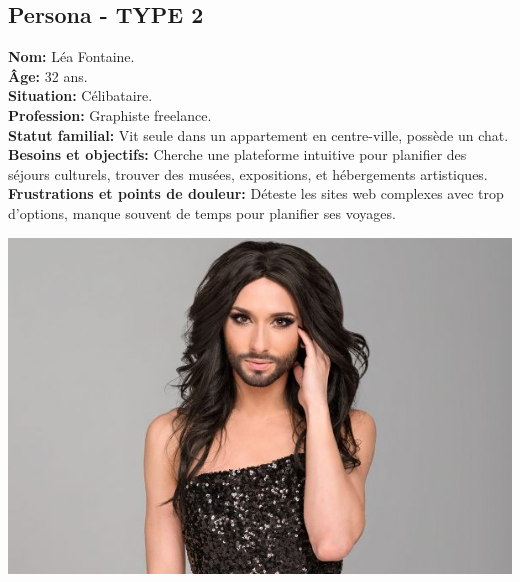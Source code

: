 \documentclass[a4paper,11pt]{article}
\begin{document}
\subsection{Persona - TYPE 2}
\begin{minipage}{0.6\textwidth} %
    \textbf{Nom:} Léa Fontaine.\\
    \textbf{Âge:} 32 ans.\\
    \textbf{Situation:} Célibataire.\\
    \textbf{Profession:} Graphiste freelance.\\
    \textbf{Statut familial:} Vit seule dans un appartement en centre-ville, possède un chat.\\
    \textbf{Besoins et objectifs:} Cherche une plateforme intuitive pour planifier des séjours culturels, trouver des musées, expositions, et hébergements artistiques.\\
    \textbf{Frustrations et points de douleur:} Déteste les sites web complexes avec trop d'options, manque souvent de temps pour planifier ses voyages.\\
\end{minipage}%
\hspace{1cm}
\begin{minipage}{0.3\textwidth} %
    \begin{center}
        \includegraphics[width=\textwidth]{images/femmeabarbe.jpg} %
    \end{center}
\end{minipage}
\end{document}
